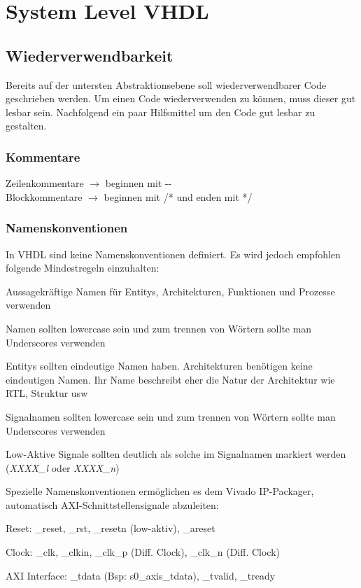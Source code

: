\section{System Level VHDL}
\subsection{Wiederverwendbarkeit}
Bereits auf der untersten Abstraktionsebene soll wiederverwendbarer Code geschrieben werden. Um einen Code wiederverwenden zu können, muss dieser gut lesbar sein. Nachfolgend ein paar Hilfsmittel um den Code gut lesbar zu gestalten.
\subsubsection{Kommentare}
Zeilenkommentare $\rightarrow$ beginnen mit -{}-\\
Blockkommentare $\rightarrow$ beginnen mit /* und enden mit */
\subsubsection{Namenskonventionen}
In VHDL sind keine Namenskonventionen definiert. Es wird jedoch empfohlen folgende Mindestregeln einzuhalten:
\begin{compactitem}
    \item Aussagekräftige Namen für Entitys, Architekturen, Funktionen und Prozesse verwenden
    \item Namen sollten lowercase sein und zum trennen von Wörtern sollte man Underscores verwenden
    \item Entitys sollten eindeutige Namen haben. Architekturen benötigen keine eindeutigen Namen. Ihr Name beschreibt eher die Natur der Architektur wie RTL, Struktur usw
    \item Signalnamen sollten lowercase sein und zum trennen von Wörtern sollte man Underscores verwenden
    \item Low-Aktive Signale sollten deutlich als solche im Signalnamen markiert werden (\textit{XXXX\_l} oder \textit{XXXX\_n})
\end{compactitem}
Spezielle Namenskonventionen ermöglichen es dem Vivado IP-Packager, automatisch AXI-Schnittstellensignale abzuleiten:
\begin{compactitem}
    \item Reset: \_reset, \_rst, \_resetn (low-aktiv), \_areset
    \item Clock: \_clk, \_clkin, \_clk\_p (Diff. Clock), \_clk\_n (Diff. Clock)
    \item AXI Interface: \_tdata (Bsp: s0\_axis\_tdata), \_tvalid, \_tready
\end{compactitem}
